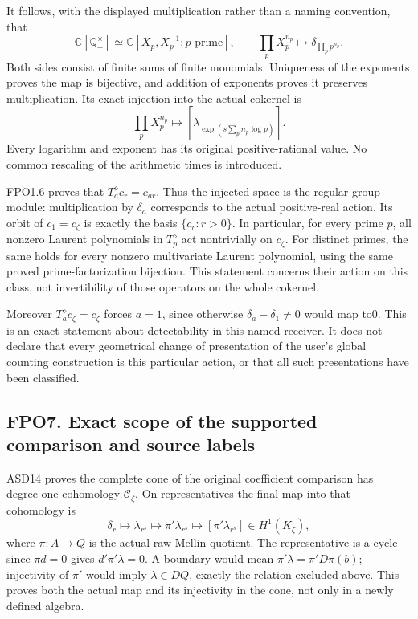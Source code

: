 It follows, with the displayed multiplication rather than a naming
convention, that \[
\mathbb C[\mathbb Q_+^\times]
 \simeq\mathbb C[X_p,X_p^{-1}:p\text{ prime}],
\qquad \prod_p X_p^{n_p}\longmapsto
 \delta_{\prod_p p^{n_p}}.
\tag{FPO6.1}
\] Both sides consist of finite sums of finite monomials. Uniqueness of
the exponents proves the map is bijective, and addition of exponents
proves it preserves multiplication. Its exact injection into the actual
cokernel is \[
\prod_p X_p^{n_p}\longmapsto
 \left[\lambda_{\exp(s\sum_p n_p\log p)}\right].
\tag{FPO6.2}
\] Every logarithm and exponent has its original positive-rational
value. No common rescaling of the arithmetic times is introduced.

FPO1.6 proves that \(T_a^\diamond c_r=c_{ar}\). Thus the injected space
is the regular group module: multiplication by \(\delta_a\) corresponds
to the actual positive-real action. Its orbit of \(c_1=c_\zeta\) is
exactly the basis \(\{c_r:r>0\}\). In particular, for every prime \(p\),
all nonzero Laurent polynomials in \(T_p^\diamond\) act nontrivially on
\(c_\zeta\). For distinct primes, the same holds for every nonzero
multivariate Laurent polynomial, using the same proved
prime-factorization bijection. This statement concerns their action on
this class, not invertibility of those operators on the whole cokernel.

Moreover \(T_a^\diamond c_\zeta=c_\zeta\) forces \(a=1\), since
otherwise \(\delta_a-\delta_1\ne0\) would map to0. This is an exact
statement about detectability in this named receiver. It does not
declare that every geometrical change of presentation of the user's
global counting construction is this particular action, or that all such
presentations have been classified.

\subsection{FPO7. Exact scope of the supported comparison and source
labels}\label{fpo7.-exact-scope-of-the-supported-comparison-and-source-labels}

ASD14 proves the complete cone of the original coefficient comparison
has degree-one cohomology \(\mathcal C_\zeta\). On representatives the
final map into that cohomology is \[
\delta_r\longmapsto\lambda_{r^s}\longmapsto\pi'\lambda_{r^s}
 \longmapsto[\pi'\lambda_{r^s}]\in H^1(K_\zeta),
\tag{FPO7.1}
\] where \(\pi:A\to Q\) is the actual raw Mellin quotient. The
representative is a cycle since \(\pi d=0\) gives \(d'\pi'\lambda=0\). A
boundary would mean \(\pi'\lambda=\pi'D\pi(b)\); injectivity of \(\pi'\)
would imply \(\lambda\in DQ\), exactly the relation excluded above. This
proves both the actual map and its injectivity in the cone, not only in
a newly defined algebra.

